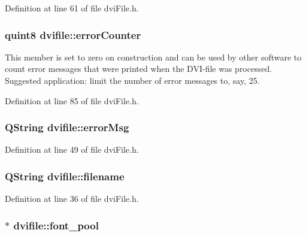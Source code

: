 Definition at line 61 of file dvi\+File.\+h.

\hypertarget{classdvifile_a9f1a21857ce4a3eeb9490ea63b1bfdcb}{
\subsubsection[{error\+Counter}]{\setlength{\rightskip}{0pt plus 5cm}quint8 dvifile\+::error\+Counter}}\label{classdvifile_a9f1a21857ce4a3eeb9490ea63b1bfdcb}
This member is set to zero on construction and can be used by other software to count error messages that were printed when the D\+V\+I-\/file was processed. Suggested application\+: limit the number of error messages to, say, 25. 

Definition at line 85 of file dvi\+File.\+h.

\hypertarget{classdvifile_a57d83b062272da49940bb34863d0b595}{
\subsubsection[{error\+Msg}]{\setlength{\rightskip}{0pt plus 5cm}Q\+String dvifile\+::error\+Msg}}\label{classdvifile_a57d83b062272da49940bb34863d0b595}


Definition at line 49 of file dvi\+File.\+h.

\hypertarget{classdvifile_a1c0fe420231e71f256b5db367b7e1178}{
\subsubsection[{filename}]{\setlength{\rightskip}{0pt plus 5cm}Q\+String dvifile\+::filename}}\label{classdvifile_a1c0fe420231e71f256b5db367b7e1178}


Definition at line 36 of file dvi\+File.\+h.

\hypertarget{classdvifile_a4864f0edcaad892f4684ab2379f061b9}{
\subsubsection[{font\+\_\+pool}]{$\ast$ dvifile\+::font\+\_\+pool}}\label{classdvifile_a4864f0edcaad892f4684ab2379f061b9}


